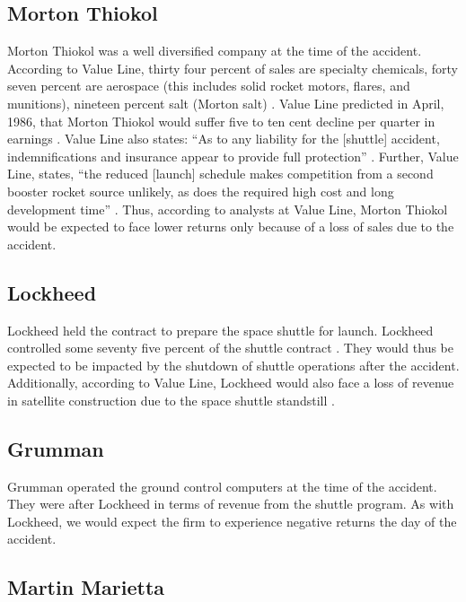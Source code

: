 \subsection{Morton Thiokol}

Morton Thiokol was a well diversified company at the time of
the accident.  According to Value Line, thirty four
percent of sales are specialty chemicals, forty seven percent
are aerospace (this includes solid rocket motors, flares,
and munitions), nineteen percent salt (Morton salt)
\cite{vlmti486}.  Value Line predicted in April, 1986,
that Morton Thiokol would suffer five to ten cent decline
per quarter in earnings \cite{vlmti486}.  Value Line also
states: ``As to any liability for the [shuttle] accident,
indemnifications and insurance appear to provide full
protection'' \cite{vlmti486}.  Further, Value Line,
states, ``the reduced [launch] schedule makes
competition from a second booster rocket source unlikely, as
does the required high cost and long development time''
\cite{vlmti486}.
Thus, according to analysts at Value Line, Morton Thiokol would be
expected to face lower returns only because of a loss of
sales due to the accident.

\subsection{Lockheed}

Lockheed held the contract to prepare the space shuttle for
launch.  Lockheed controlled some seventy five percent of
the shuttle contract \cite{wsjfirms}.  They would thus be
expected to be impacted by the shutdown of shuttle
operations after the accident.  Additionally, according to
Value Line, Lockheed would also face a loss of revenue
in satellite construction due to the space shuttle
standstill \cite{vllock786}.

\subsection{Grumman}

Grumman operated the ground control computers at the time of
the accident.  They were after Lockheed in terms of revenue
from the shuttle program.  As with Lockheed, we would expect
the firm to experience negative returns the day of the
accident.

\subsection{Martin Marietta}

